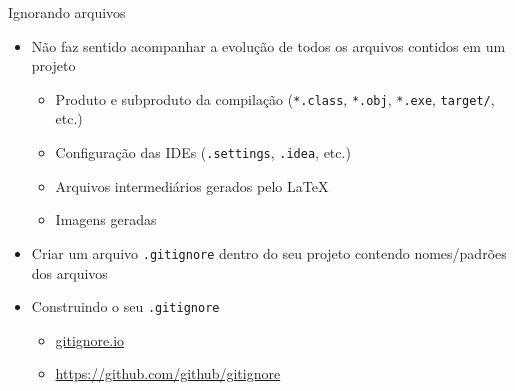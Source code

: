 \documentclass[14pt]{beamer}
\begin{document}
\begin{frame}{Ignorando arquivos}
    \begin{itemize}
        \item Não faz sentido acompanhar a evolução de todos os arquivos
        contidos em um projeto
        \begin{itemize}
            \item Produto e subproduto da compilação (\texttt{*.class},
            \texttt{*.obj}, \texttt{*.exe}, \texttt{target/}, etc.)
            \item Configuração das IDEs (\texttt{.settings}, \texttt{.idea},
            etc.)
            \item Arquivos intermediários gerados pelo \LaTeX
            \item Imagens geradas
        \end{itemize}
        \item Criar um arquivo \texttt{.gitignore} dentro do seu projeto
        contendo nomes/padrões dos arquivos
        \item Construindo o seu \texttt{.gitignore}
        \begin{itemize}
            \item \href{https://gitignore.io}{gitignore.io}
            \item \url{https://github.com/github/gitignore}
            \end{itemize}
    \end{itemize}
\end{frame}
\end{document}
